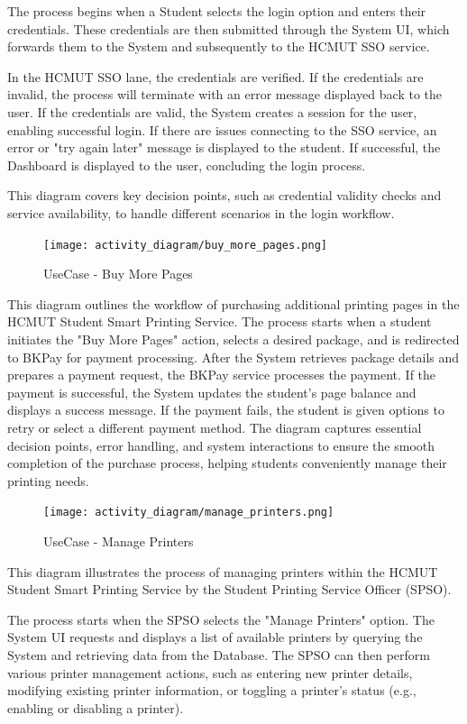 \documentclass[a4paper]{report}
\begin{document}
The process begins when a Student selects the login option and enters their credentials. These credentials are then submitted through the System UI, which forwards them to the System and subsequently to the HCMUT SSO service.

In the HCMUT SSO lane, the credentials are verified. If the credentials are invalid, the process will terminate with an error message displayed back to the user. If the credentials are valid, the System creates a session for the user, enabling successful login. If there are issues connecting to the SSO service, an error or "try again later" message is displayed to the student. If successful, the Dashboard is displayed to the user, concluding the login process.

This diagram covers key decision points, such as credential validity checks and service availability, to handle different scenarios in the login workflow.

\begin{figure}[H]
    \centering
    \texttt{[image: activity\_diagram/buy\_more\_pages.png]}
    \caption{UseCase - Buy More Pages}
\end{figure}
This diagram outlines the workflow of purchasing additional printing pages in the HCMUT Student Smart Printing Service. The process starts when a student initiates the "Buy More Pages" action, selects a desired package, and is redirected to BKPay for payment processing. After the System retrieves package details and prepares a payment request, the BKPay service processes the payment. If the payment is successful, the System updates the student’s page balance and displays a success message. If the payment fails, the student is given options to retry or select a different payment method. The diagram captures essential decision points, error handling, and system interactions to ensure the smooth completion of the purchase process, helping students conveniently manage their printing needs.

\begin{figure}[H]
    \centering
    \texttt{[image: activity\_diagram/manage\_printers.png]}
    \caption{UseCase - Manage Printers}
\end{figure}
This diagram illustrates the process of managing printers within the HCMUT Student Smart Printing Service by the Student Printing Service Officer (SPSO).

The process starts when the SPSO selects the "Manage Printers" option. The System UI requests and displays a list of available printers by querying the System and retrieving data from the Database. The SPSO can then perform various printer management actions, such as entering new printer details, modifying existing printer information, or toggling a printer's status (e.g., enabling or disabling a printer).
\end{document}
